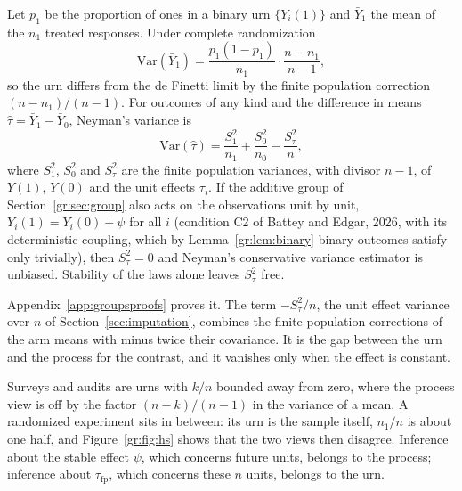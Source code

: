 \begin{proposition}\label{gr:prop:fpc}
Let $p_1$ be the proportion of ones in a binary urn $\{Y_i(1)\}$ and $\bar Y_1$ the mean of the $n_1$ treated responses. Under complete randomization
\[
\mathrm{Var}(\bar Y_1)=\frac{p_1(1-p_1)}{n_1}\cdot\frac{n-n_1}{n-1},
\]
so the urn differs from the de Finetti limit by the finite population correction $(n-n_1)/(n-1)$. For outcomes of any kind and the difference in means $\hat\tau=\bar Y_1-\bar Y_0$, Neyman's variance is
\[
\mathrm{Var}(\hat\tau)=\frac{S_1^2}{n_1}+\frac{S_0^2}{n_0}-\frac{S_\tau^2}{n},
\]
where $S_1^2$, $S_0^2$ and $S_\tau^2$ are the finite population variances, with divisor $n-1$, of $Y(1)$, $Y(0)$ and the unit effects $\tau_i$. If the additive group of Section~\ref{gr:sec:group} also acts on the observations unit by unit, $Y_i(1)=Y_i(0)+\psi$ for all $i$ (condition C2 of Battey and Edgar, 2026, with its deterministic coupling, which by Lemma~\ref{gr:lem:binary} binary outcomes satisfy only trivially), then $S_\tau^2=0$ and Neyman's conservative variance estimator is unbiased. Stability of the laws alone leaves $S_\tau^2$ free.
\end{proposition}

Appendix~\ref{app:groupsproofs} proves it. The term $-S_\tau^2/n$, the unit effect variance over $n$ of Section~\ref{sec:imputation}, combines the finite population corrections of the arm means with minus twice their covariance. It is the gap between the urn and the process for the contrast, and it vanishes only when the effect is constant.

Surveys and audits are urns with $k/n$ bounded away from zero, where the process view is off by the factor $(n-k)/(n-1)$ in the variance of a mean. A randomized experiment sits in between: its urn is the sample itself, $n_1/n$ is about one half, and Figure~\ref{gr:fig:hs} shows that the two views then disagree. Inference about the stable effect $\psi$, which concerns future units, belongs to the process; inference about $\tau_{\mathrm{fp}}$, which concerns these $n$ units, belongs to the urn.

